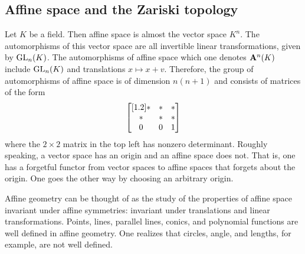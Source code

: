 \documentclass [11 pt, oneside, margin = 1 in] {article}
\begin{document}
\subsection{Affine space and the Zariski topology}
Let $K$ be a field. Then affine space is almost the vector space $K^n$. The automorphisms of this vector space are all invertible linear transformations, given by $\operatorname{GL}_{n}(K)$. The automorphisms of affine space which one denotes $\mathbf{A}^n(K)$ include $\operatorname{GL}_{n}(K)$ and translations $x \longmapsto x+v$. Therefore, the group of automorphisms of affine space is of dimension $n(n+1)$ and consists of matrices of the form
\begin{align*}
	\begin{bmatrix} [ 1.2 ] *&*&*\\ \text{}*&*&*\\0&0&1\end{bmatrix}
\end{align*}
where the $2\times 2$ matrix in the top left has nonzero determinant. Roughly speaking, a vector space has an origin and an affine space does not. That is, one has a forgetful functor from vector spaces to affine spaces that forgets about the origin. One goes the other way by choosing an arbitrary origin. 

Affine geometry can be thought of as the study of the properties of affine space invariant under affine symmetries: invariant under translations and linear transformations. Points, lines, parallel lines, conics, and polynomial functions are well defined in affine geometry. One realizes that circles, angle, and lengths, for example, are not well defined.
\end{document}
